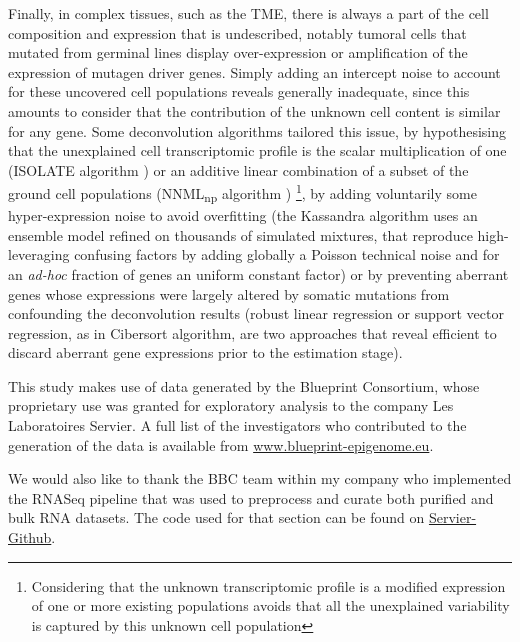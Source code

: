 \documentclass[long, final]{jobim}
\begin{document}
Finally, in complex tissues, such as the TME, there is always a part of the cell composition and expression that is undescribed, notably tumoral cells that mutated from germinal lines display over-expression or amplification of the expression of mutagen driver genes. Simply adding an intercept noise to account for these uncovered cell populations reveals generally inadequate, since this amounts to consider that the contribution of the unknown cell content is similar for any gene. Some deconvolution algorithms tailored this issue, by hypothesising that the unexplained cell transcriptomic profile is the scalar multiplication of one (ISOLATE algorithm \cite{quon_morris09}) or an additive linear combination of a subset of the ground cell populations (NNML\textsubscript{np} algorithm \cite{qiao_etal12}) \footnote{Considering that the unknown transcriptomic profile is a modified expression of one or more existing populations avoids that all the unexplained variability is captured by this unknown cell population}, by adding voluntarily some hyper-expression noise to avoid overfitting (the Kassandra algorithm uses an ensemble model refined on thousands of simulated mixtures, that reproduce high-leveraging confusing factors by adding globally a Poisson technical noise and for an \textit{ad-hoc} fraction of genes an uniform constant factor) or by preventing aberrant genes whose expressions were largely altered by somatic mutations from confounding the deconvolution results (robust linear regression or support vector regression, as in Cibersort algorithm, are two approaches that reveal efficient to discard aberrant gene expressions prior to the estimation stage).


\begin{acknowledgements}
  \label{sec:acknowledgements}
This study makes use of data generated by the Blueprint Consortium, whose proprietary use was granted for exploratory analysis to the company Les Laboratoires Servier. A full list of the investigators who contributed to the generation of the data is available from \url{www.blueprint-epigenome.eu}.

We would also like to thank the BBC team within my company who implemented the RNASeq pipeline that was used to preprocess and curate both purified and bulk RNA datasets. The code used for that section can be found on \href{https://github.com/orgs/servier-github/repositories}{Servier-Github}.

\end{acknowledgements}
\end{document}
